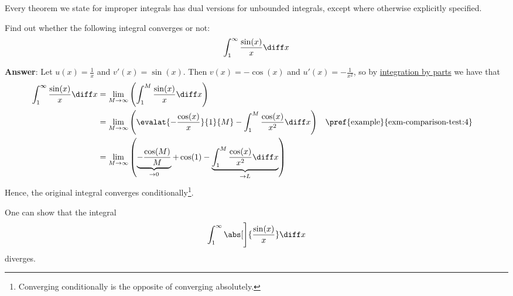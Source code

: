 \begin{rem}
	Every theorem we state for improper integrals has dual versions for unbounded integrals,
	except where otherwise explicitly specified.
\end{rem}

\begin{exm}\label{exm-comparison-test:5}
	Find out whether the following integral converges or not:
	\begin{equation*}
		\int_1^\infty \frac{\sin(x)}{x} \diff x
	\end{equation*}
	\begin{flushleft}
		\textbf{Answer}: Let $u(x)=\tfrac{1}{x}$ and $v'(x)=\sin(x)$. Then $v(x)=-\cos(x)$
		and $u'(x)=-\tfrac{1}{x^2}$, so by \hyperref[thm-integration-by-parts-definite-integrals]{integration by parts}
		we have that
		\begin{align*}
			\int_1^\infty \frac{\sin(x)}{x} \diff x
			 & = \lim_{M\to\infty}\left(\int_1^M \frac{\sin(x)}{x} \diff x\right)                                                                                                                       \\
			 & = \lim_{M\to\infty}\left(\evalat{-\frac{\cos(x)}{x}}{1}{M}-\int_1^M\frac{\cos(x)}{x^2}\diff x\right)                                   &  & \text{\pref{example}{exm-comparison-test:4}} \\
			 & = \lim_{M\to\infty}\left(\underbrace{-\frac{\cos(M)}{M}}_{\to0}+\cos(1)-\underbrace{\int_1^M\frac{\cos(x)}{x^2}\diff x}_{\to L}\right)
		\end{align*}
		Hence, the original integral converges conditionally\footnote{Converging
			conditionally is the opposite of converging absolutely.}.
	\end{flushleft}
\end{exm}

\begin{rem}\label{rem-exm-comparison-test:5-diverges}
	One can show that the integral
	\begin{equation*}
		\int_1^\infty \abs[\Bigg]{\frac{\sin(x)}{x}} \diff x
	\end{equation*}
	diverges.
\end{rem}

